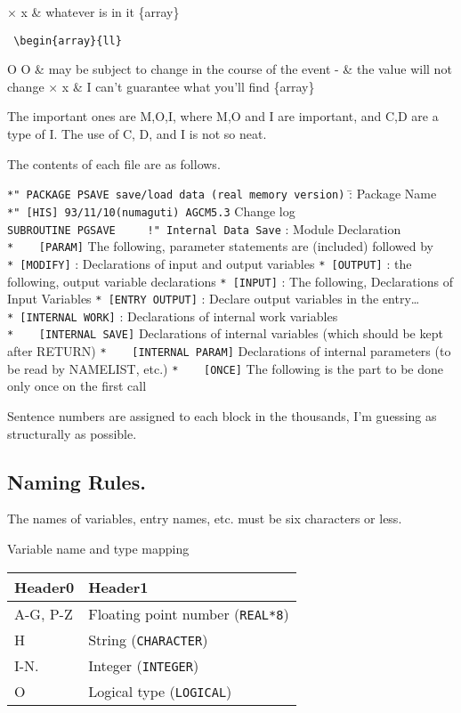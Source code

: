 × x \& whatever is in it \{array\}

\begin{verbatim}
 \begin{array}{ll}   
\end{verbatim}

O O \& may be subject to change in the course of the event - \& the
value will not change × x \& I can't guarantee what you'll find
\{array\}

The important ones are M,O,I, where M,O and I are important, and C,D are
a type of I. The use of C, D, and I is not so neat.

The contents of each file are as follows.

\texttt{*"\ PACKAGE\ PSAVE\ save/load\ data\ (real\ memory\ version)} :̄
Package Name \texttt{*"\ {[}HIS{]}\ 93/11/10(numaguti)\ AGCM5.3} Change
log \texttt{SUBROUTINE\ PGSAVE\ \ \ \ \ !"\ Internal\ Data\ Save} :
Module Declaration \texttt{*\ \ \ \ {[}PARAM{]}} The following,
parameter statements are (included) followed by \texttt{*\ {[}MODIFY{]}}
: Declarations of input and output variables \texttt{*\ {[}OUTPUT{]}} :
the following, output variable declarations \texttt{*\ {[}INPUT{]}} :
The following, Declarations of Input Variables
\texttt{*\ {[}ENTRY\ OUTPUT{]}} : Declare output variables in the
entry\ldots{} \texttt{*\ {[}INTERNAL\ WORK{]}} : Declarations of
internal work variables \texttt{*\ \ \ \ {[}INTERNAL\ SAVE{]}}
Declarations of internal variables (which should be kept after RETURN)
\texttt{*\ \ \ \ {[}INTERNAL\ PARAM{]}} Declarations of internal
parameters (to be read by NAMELIST, etc.) \texttt{*\ \ \ \ {[}ONCE{]}}
The following is the part to be done only once on the first call

Sentence numbers are assigned to each block in the thousands, I'm
guessing as structurally as possible.

\hypertarget{naming-rules.}{%
\subsection{Naming Rules.}\label{naming-rules.}}

The names of variables, entry names, etc. must be six characters or
less.

Variable name and type mapping

\begin{longtable}[]{@{}ll@{}}
\toprule
Header0 & Header1\tabularnewline
\midrule
\endhead
A-G, P-Z & Floating point number ({\texttt{REAL*8}})\tabularnewline
H & String ({\texttt{CHARACTER}})\tabularnewline
I-N. & Integer ({\texttt{INTEGER}})\tabularnewline
O & Logical type ({\texttt{LOGICAL}})\tabularnewline
\bottomrule
\end{longtable}


